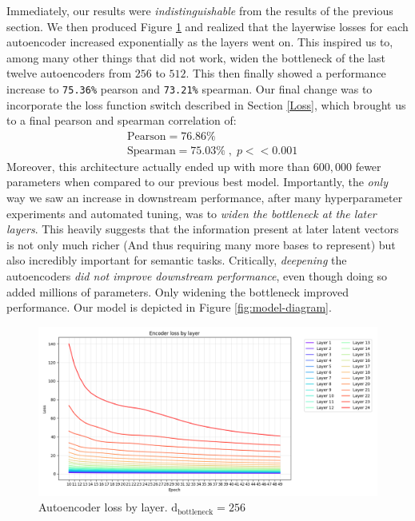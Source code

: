 \documentclass{article}
\begin{document}
Immediately, our results were \textit{indistinguishable} from the results of the previous section. We then produced Figure \ref{fig:autoencoder-loss} and realized that the layerwise losses for each autoencoder increased exponentially as the layers went on. This inspired us to, among many other things that did not work, widen the bottleneck of the last twelve autoencoders from $256$ to $512$. This then finally showed a performance increase to \verb|75.36%| pearson and \verb|73.21%| spearman. Our final change was to incorporate the loss function switch described in Section \ref{Loss}, which brought us to a final pearson and spearman correlation of:
\begin{align*}
    &\text{Pearson} = 76.86\%\\
    &\text{Spearman} = 75.03\%\;,\; p << 0.001
\end{align*}
Moreover, this architecture actually ended up with more than $600,000$ fewer parameters when compared to our previous best model. Importantly, the \textit{only} way we saw an increase in downstream performance, after many hyperparameter experiments and automated tuning, was to \textit{widen the bottleneck at the later layers}. This heavily suggests that the information present at later latent vectors is not only much richer (And thus requiring many more bases to represent) but also incredibly important for semantic tasks. Critically, \textit{deepening} the autoencoders \textit{did not improve downstream performance}, even though doing so added millions of parameters. Only widening the bottleneck improved performance. Our model is depicted in Figure \ref{fig:model-diagram}.

\begin{figure}
    \centering
    \includegraphics[width=1\linewidth]{encoder_loss.png}
    \caption{Autoencoder loss by layer. $\text{d}_\text{bottleneck} = 256$}
    \label{fig:autoencoder-loss}
\end{figure}
\end{document}
